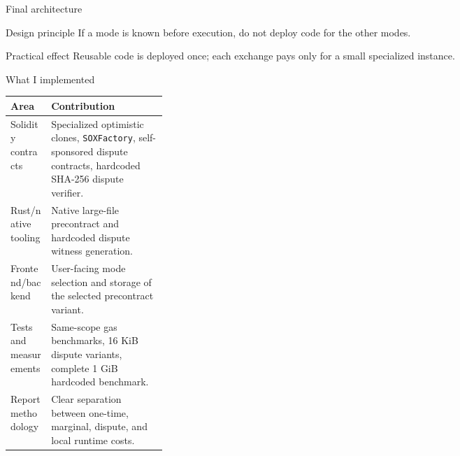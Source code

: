 \documentclass[aspectratio=169,10pt]{beamer}
\newcommand{\giB}{GiB}
\newcommand{\kib}{KiB}
\begin{document}
\begin{frame}{Final architecture}
  \begin{center}
  \end{center}
  \vspace{0.8em}
  \begin{block}{Design principle}
    If a mode is known before execution, do not deploy code for the other modes.
  \end{block}
  \begin{block}{Practical effect}
    Reusable code is deployed once; each exchange pays only for a small specialized instance.
  \end{block}
\end{frame}

\begin{frame}{What I implemented}
  \small
  \begin{tabularx}{\linewidth}{>{\raggedright\arraybackslash}p{0.26\linewidth}>{\raggedright\arraybackslash}X}
    \toprule
    Area & Contribution \\
    \midrule
    Solidity contracts &
    Specialized optimistic clones, \texttt{SOXFactory}, self-sponsored dispute contracts,
    hardcoded SHA-256 dispute verifier. \\
    Rust/native tooling &
    Native large-file precontract and hardcoded dispute witness generation. \\
    Frontend/backend &
    User-facing mode selection and storage of the selected precontract variant. \\
    Tests and measurements &
    Same-scope gas benchmarks, 16 \kib{} dispute variants, complete 1 \giB{} hardcoded benchmark. \\
    Report methodology &
    Clear separation between one-time, marginal, dispute, and local runtime costs. \\
    \bottomrule
  \end{tabularx}
\end{frame}
\end{document}
